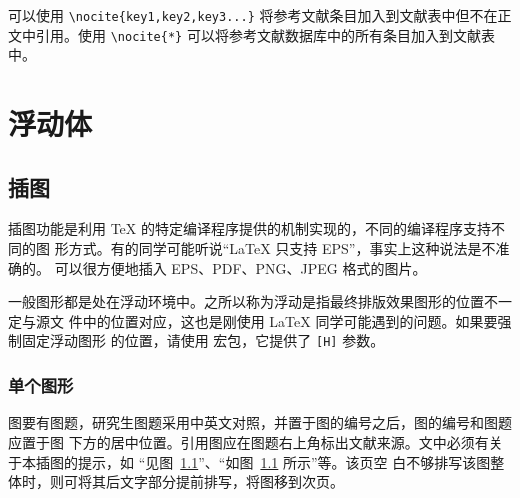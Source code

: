 \documentclass{sjtureport}
\begin{document}
可以使用 \verb|\nocite{key1,key2,key3...}| 将参考文献条目加入到文献表中但不在正
文中引用。使用 \verb|\nocite{*}| 可以将参考文献数据库中的所有条目加入到文献表
中。
\nocite{Yang1999,Schinstock2000,Wen1990,GBT16159}


\chapter{浮动体}

\section{插图}

插图功能是利用 \TeX{} 的特定编译程序提供的机制实现的，不同的编译程序支持不同的图
形方式。有的同学可能听说“\LaTeX{} 只支持 EPS”，事实上这种说法是不准确的。\XeTeX{}
可以很方便地插入 EPS、PDF、PNG、JPEG 格式的图片。

一般图形都是处在浮动环境中。之所以称为浮动是指最终排版效果图形的位置不一定与源文
件中的位置对应，这也是刚使用 \LaTeX{} 同学可能遇到的问题。如果要强制固定浮动图形
的位置，请使用  宏包，它提供了 \texttt{[H]} 参数。

\subsection{单个图形}

图要有图题，研究生图题采用中英文对照，并置于图的编号之后，图的编号和图题应置于图
下方的居中位置。引用图应在图题右上角标出文献来源。文中必须有关于本插图的提示，如
“见图~\ref{fig:energy-distrib}”、“如图~\ref{fig:energy-distrib} 所示”等。该页空
白不够排写该图整体时，则可将其后文字部分提前排写，将图移到次页。

\begin{figure}[!htp]
	\centering
	\label{fig:energy-distrib}
\end{figure}
\end{document}
